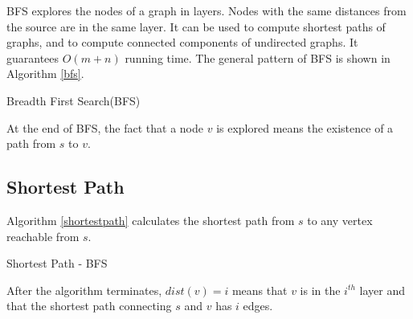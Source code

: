 BFS explores the nodes of a graph in layers. Nodes with the same distances from the source are in the same layer. It can be used to compute shortest paths of graphs, and to compute connected components of undirected graphs. It guarantees $O(m+n)$ running time. The general pattern of BFS is shown in Algorithm \ref{bfs}.
\begin{algorithm}[ht]
\caption{Breadth First Search(BFS)}\label{bfs}
\begin{algorithmic}[1]
\Input{}
\Output{}
\EndIf
\EndFor
\EndWhile 
\end{algorithmic}
\end{algorithm}

At the end of BFS, the fact that a node $v$ is explored means the existence of a path from $s$ to $v$. 
\subsection{Shortest Path}
Algorithm \ref{shortestpath} calculates the shortest path from $s$ to any vertex reachable from $s$.
\begin{algorithm}[ht]
\caption{Shortest Path - BFS}\label{shortestpath}
\begin{algorithmic}[1]
\Input{}
\Output{}
\EndIf
\EndFor
\EndWhile 
\end{algorithmic}
\end{algorithm}

After the algorithm terminates, $dist(v)=i$ means that $v$ is in the $i^{th}$ layer and that the shortest path connecting $s$ and $v$ has $i$ edges.
